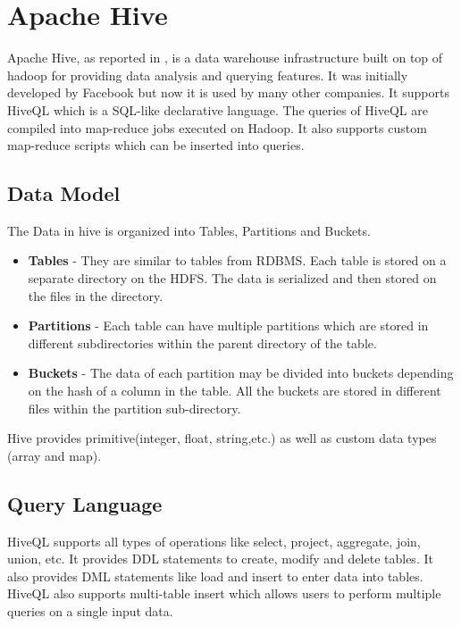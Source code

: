 \documentclass[12pt]{book}
\begin{document}

\section{Apache Hive}
Apache Hive, as reported in \cite{Hive} , is a data warehouse infrastructure built on top of hadoop for providing data analysis and querying features. It was initially 
developed by Facebook but now it is used by many other companies. It supports HiveQL which is a SQL-like declarative language. The queries of
HiveQL are compiled into map-reduce jobs executed on Hadoop. It also supports custom map-reduce scripts which can be inserted into queries.
\subsection{Data Model}
The Data in hive is organized into Tables, Partitions and Buckets.
\begin{itemize}
 \item \textbf{Tables} - They are similar to tables from RDBMS. Each table is stored on a separate directory on the HDFS. The data is 
 serialized and then stored on the files in the directory.
 \item \textbf{Partitions} - Each table can have multiple partitions which are stored in different subdirectories within the parent directory
 of the table.
 \item \textbf{Buckets} - The data of each partition may be divided into buckets depending on the hash of a column in the table.
 All the buckets are stored in different files within the partition sub-directory.
\end{itemize}
Hive provides primitive(integer, float, string,etc.) as well as custom data types (array and map).
\subsection{Query Language}
HiveQL supports all types of operations like select, project, aggregate, join, union, etc.
It provides DDL statements to create, modify and delete tables. It also provides DML statements like load and insert to enter data into
tables. HiveQL also supports multi-table insert which allows users to perform multiple queries on a single input data.
\end{document}

